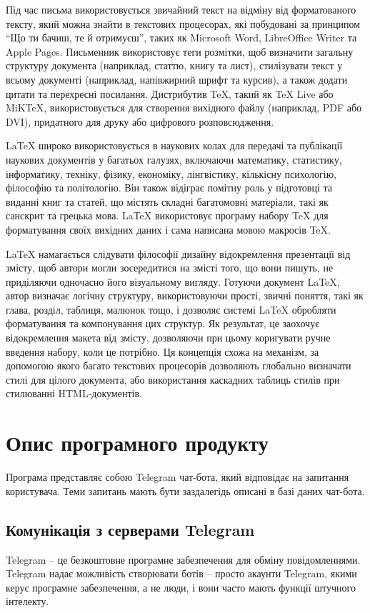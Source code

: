 \documentclass[a4paper,14pt]{extreport}
\begin{document}
    Під час письма використовується звичайний текст на відміну від форматованого тексту, який можна знайти в текстових процесорах, які побудовані за принципом ``Що ти бачиш, те й отримуєш'', таких як Microsoft Word, LibreOffice Writer та Apple Pages. Письменник використовує теги розмітки, щоб визначити загальну структуру документа (наприклад, статтю, книгу та лист), стилізувати текст у всьому документі (наприклад, напівжирний шрифт та курсив), а також додати цитати та перехресні посилання. Дистрибутив TeX, такий як TeX Live або MiKTeX, використовується для створення вихідного файлу (наприклад, PDF або DVI), придатного для друку або цифрового розповсюдження.

    \LaTeX{} широко використовується в наукових колах \cite{latex:friends} \cite{latex:oss-devs-latex} для передачі та публікації наукових документів у багатьох галузях, включаючи математику, статистику, інформатику, техніку, фізику, економіку, лінгвістику, кількісну психологію, філософію та політологію. Він також відіграє помітну роль у підготовці та виданні книг та статей, що містять складні багатомовні матеріали, такі як санскрит та грецька мова. \LaTeX{} використовує програму набору TeX для форматування своїх вихідних даних і сама написана мовою макросів TeX.

    \LaTeX{} намагається слідувати філософії дизайну відокремлення презентації від змісту, щоб автори могли зосередитися на змісті того, що вони пишуть, не приділяючи одночасно його візуальному вигляду. Готуючи документ \LaTeX{}, автор визначає логічну структуру, використовуючи прості, звичні поняття, такі як глава, розділ, таблиця, малюнок тощо, і дозволяє системі \LaTeX{} обробляти форматування та компонування цих структур. Як результат, це заохочує відокремлення макета від змісту, дозволяючи при цьому коригувати ручне введення набору, коли це потрібно. Ця концепція схожа на механізм, за допомогою якого багато текстових процесорів дозволяють глобально визначати стилі для цілого документа, або використання каскадних таблиць стилів при стилюванні HTML-документів.

\section{Опис програмного продукту}
    Програма представляє собою Telegram чат-бота, який відповідає на запитання користувача. Теми запитань мають бути заздалегідь описані в базі даних чат-бота.

    \subsection{Комунікація з серверами Telegram}
    Telegram -- це безкоштовне програмне забезпечення для обміну повідомленнями. Telegram надає можливість створювати ботів -- просто акаунти Telegram, якими керує програмне забезпечення, а не люди, і вони часто мають функції штучного інтелекту.
\end{document}
